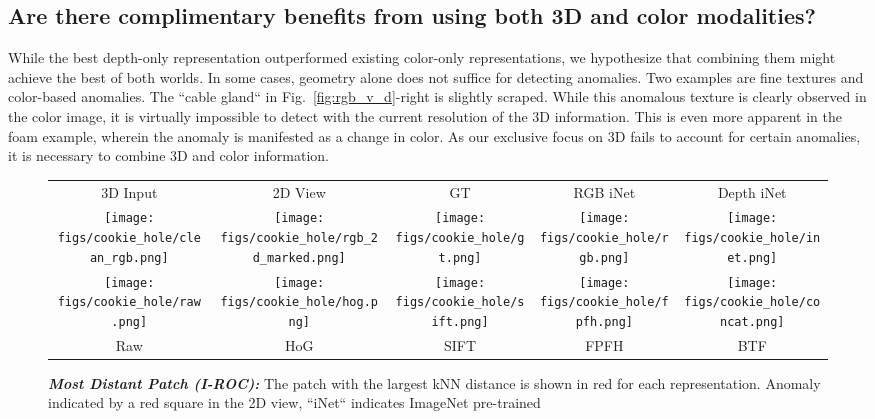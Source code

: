 \documentclass{article}
\begin{document}
\subsection{Are there complimentary benefits from using both 3D and color modalities?}

While the best depth-only representation outperformed existing color-only representations, we hypothesize that combining them might achieve the best of both worlds. In some cases, geometry alone does not suffice for detecting anomalies. Two examples are fine textures and color-based anomalies. The ``cable gland`` in Fig.~\ref{fig:rgb_v_d}-right is slightly scraped. While this anomalous texture is clearly observed in the color image, it is virtually impossible to detect with the current resolution of the 3D information. This is even more apparent in the foam example, wherein the anomaly is manifested as a change in color. As our exclusive focus on 3D fails to account for certain anomalies, it is necessary to combine 3D and color information.


\begin{figure*}[t]
\begin{tabular}{@{\hskip1pt}c@{\hskip1pt}c@{\hskip1pt}c@{\hskip1pt}c@{\hskip1pt}c}
3D Input & 2D View & GT & RGB iNet & Depth iNet\\
\texttt{[image: figs/cookie\_hole/clean\_rgb.png]} & 
\texttt{[image: figs/cookie\_hole/rgb\_2d\_marked.png]} & 
\texttt{[image: figs/cookie\_hole/gt.png]} & 
\texttt{[image: figs/cookie\_hole/rgb.png]} & 
\texttt{[image: figs/cookie\_hole/inet.png]} \\
\texttt{[image: figs/cookie\_hole/raw.png]} & 
\texttt{[image: figs/cookie\_hole/hog.png]} & 
\texttt{[image: figs/cookie\_hole/sift.png]} & 
\texttt{[image: figs/cookie\_hole/fpfh.png]} & 
\texttt{[image: figs/cookie\_hole/concat.png]} \\
Raw & HoG & SIFT & FPFH & BTF \\
\end{tabular}
 \caption{\textit{\textbf{Most Distant Patch (\textit{I-ROC}):}} The patch with the largest kNN distance is shown in red for each representation. Anomaly indicated by a red square in the 2D view, ``iNet`` indicates ImageNet pre-trained}
\label{fig:max_patch}
\end{figure*}
\end{document}
